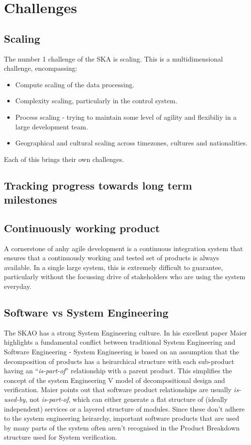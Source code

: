 \documentclass[a4paper,
               biblatex,     %
               keeplastbox,   %
               ]{jacow}
\begin{document}
\section{Challenges}
\subsection{Scaling}
The number 1 challenge of the SKA is scaling. This is a multidimensional challenge, encompassing:
\begin{itemize}
	\item Compute scaling of the data processing.
	\item Complexity scaling, particularly in the control system.
	\item Process scaling - trying to maintain some level of agility and flexibiliy in a large development team.
	\item Geographical and cultural scaling across timezones, cultures and nationalities.
\end{itemize}
Each of this brings their own challenges.

\subsection{Tracking progress towards long term milestones}
\subsection{Continuously working product}
A cornerstone of anhy agile development is a continuous integration system that ensures that a continuously  working and tested set of products is always available. In a single large system, this is extremely difficult to guarantee, particularly without the focussing drive of stakeholders who are using the system everyday.

\subsection{Software vs System Engineering}
The SKAO has a strong System Engineering culture. In his excellent paper Maier highlights a fundamental conflict between traditional System Engineering and Software Engineering - System Engineering is based on an assumption that the decomposition of products has a heirarchical structure with each sub-product having an ``{\em is-part-of}'' relationship with a parent product. This simplifies the concept of the system Engineering V model of decompositional design and verification. Maier points out that software product relationships are usually {\em is-used-by}, not {\em is-part-of}, which can either generate a flat structure of (ideally independent) services or a layered structure of modules. Since these don't adhere to the system engineering heirarchy, important software products that are used by many parts of the system often aren't recognised in the Product Breakdown structure used for System verification.
\end{document}
